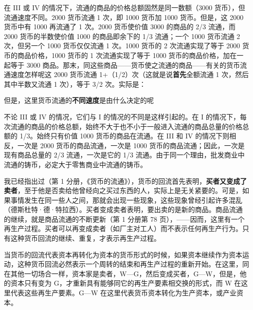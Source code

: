 
在 III 或 IV 的情况下，流通的商品的价格总额固然是同一数额（3000 货币），但流通速度不同。2000 货币流通 1 次，即 1000 货币加 1000 货币。但是，这 2000 货币中有 1000 再流通了 1 次。2000 货币使价值 3000 的商品的 2/3 流通，而 2000 货币的半数使价值 1000 的商品即余下的 1/3 流通；一个 1000 货币流通 2 次，但另一个 1000 货币仅仅流通 1 次。1000 货币的 2 次流通实现了等于 2000 货币的商品价格，1000 货币的 1 次流通实现了等于 1000 货币的商品价格，加在一起等于 3000 商品。那末，同这些商品——货币使之流通的商品——有关的货币流通速度怎样呢这 2000 货币流通 1+（1/2）次（这就是说\textbf{首先}全额流通 1 次，然后其中半数又流通 1 次），等于 3/2 次。实际是：


但是，这里货币流通的\textbf{不同速度}是由什么决定的呢

不论 III 或 IV 的情况，它们与 I 的情况的不同是这样引起的。在 I 的情况下，每次流通的商品的价格总额，始终不大于也不小于一般进入流通的商品总量的价格总额的 1/3。始终只有价值 1000 货币的商品在流通。在 III 和 IV 的情况下则相反，一次是 2000 货币的商品流通，一次是 1000 货币的商品流通；因此，一次是现有商品总量的 2/3 流通，一次是它的 1/3 流通。由于同一个理由，批发商业中流通的铸币，必定大于零售商业中流通的铸币。

我已经指出过（第 1 分册，《货币的流通》），货币的回流首先表明，\textbf{买者又变成了卖者}，至于他是否卖给他曾经向之买过东西的人，实际上是无关紧要的。可是，如果事情发生在同一些人之间，那就会出现一些现象，这些现象曾经引起许多混乱（德斯杜特·德·特拉西）。买者变成卖者表明，要出卖的是新的商品。商品流通的继续，就是商品流通的不断更新（第 1 分册第 78 页），——因而，这里有一个再生产过程。买者可以再变成卖者（如厂主对工人）而不表示任何再生产行为。只有这种货币回流的继续、重复，才表示再生产过程。

当货币的回流代表资本再转化为资本的货币形式的时候，如果资本继续作为资本运动，这种货币回流必然表示一个周转的结束和再生产过程的重新开始。在这里，同在其他一切场合一样，资本家是卖者，W—G，然后变成买者，G—W，但是，他的资本只有变为 G，才重新具有能够同它的再生产要素相交换的形式，而 W 在这里代表这些再生产要素。G—W 在这里代表货币资本转化为生产资本，或产业资本。

